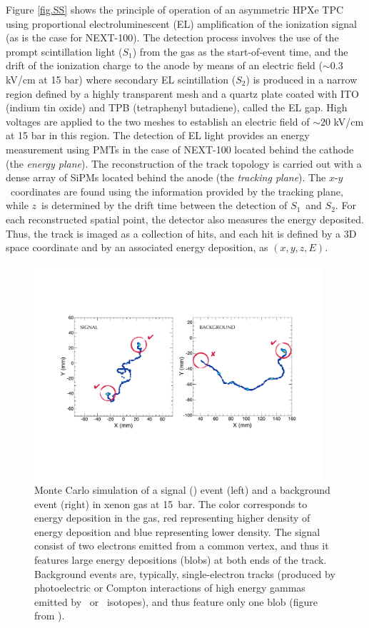 \documentclass[a4paper,11pt]{article}
\begin{document}
Figure \ref{fig.SS} shows the principle of operation of an asymmetric HPXe TPC using proportional electroluminescent (EL) amplification of the ionization signal (as is the case for NEXT-100). The detection process involves the use of the prompt scintillation light ($S_1$) from the gas as the start-of-event time, and the drift of the ionization charge to the anode by means of an electric field ($\sim0.3$ kV/cm at 15 bar) where secondary EL scintillation ($S_2$) is produced in a narrow region defined by a highly transparent mesh and a quartz plate coated with ITO (indium tin oxide) and TPB (tetraphenyl butadiene), called the EL gap.  High voltages are applied to the two meshes to establish an electric field of $\sim 20$ kV/cm at 15 bar in this region. The detection of EL light provides an energy measurement using PMTs in the case of NEXT-100 located behind the cathode (the \emph{energy plane}). The reconstruction of the track topology is carried out with a dense array of SiPMs located behind the anode (the \emph{tracking plane}). The $x$-$y$~coordinates are found using the information provided by the tracking plane, while $z$~is determined by the drift time between the detection of $S_1$~and $S_2$. For each reconstructed spatial point, the detector also measures the energy deposited. Thus, the track is imaged as a collection of hits, and each hit is defined by a 3D space coordinate and by an associated energy deposition, as $(x, y, z, E)$.

\begin{figure}[!htb]
\centering
\includegraphics[width= 0.95\textwidth]{fig/TrackSignature.pdf}
\caption{Monte Carlo simulation of a signal (\bbonu) event (left) and a background event (right) in xenon gas at 15~bar. The color corresponds to energy deposition in the gas, red representing higher density of energy deposition and blue representing lower density. The signal consist of two electrons emitted from a common vertex, and thus it features large energy depositions (blobs) at both ends of the track. Background events are, typically, single-electron tracks (produced by photoelectric or Compton interactions of high energy gammas emitted by \BI\ or \TL\ isotopes), and thus feature only one blob (figure from \cite{NEXT_sensitivity}).} \label{fig.ETRK2}
\end{figure}
\end{document}
